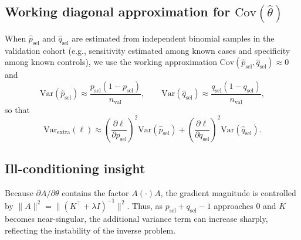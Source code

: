 \documentclass[pdflatex,sn-mathphys-num]{sn-jnl}%
\theoremstyle{thmstyleone}%
\theoremstyle{thmstyletwo}%
\theoremstyle{thmstylethree}%
\begin{document}
\subsection*{Working diagonal approximation for $\mathrm{Cov}(\hat\theta)$}

When $\hat p_{\mathrm{sel}}$ and $\hat q_{\mathrm{sel}}$ are estimated from independent binomial samples in the
validation cohort (e.g., sensitivity estimated among known cases and specificity among known controls),
we use the working approximation $\mathrm{Cov}(\hat p_{\mathrm{sel}},\hat q_{\mathrm{sel}})\approx 0$ and
\[
\mathrm{Var}(\hat p_{\mathrm{sel}})\approx \frac{p_{\mathrm{sel}}(1-p_{\mathrm{sel}})}{n_{\mathrm{val}}},
\qquad
\mathrm{Var}(\hat q_{\mathrm{sel}})\approx \frac{q_{\mathrm{sel}}(1-q_{\mathrm{sel}})}{n_{\mathrm{val}}},
\]
so that
\[
\mathrm{Var}_{\mathrm{extra}}(\ell)
\approx
\left(\frac{\partial \ell}{\partial p_{\mathrm{sel}}}\right)^2 \mathrm{Var}(\hat p_{\mathrm{sel}})
+
\left(\frac{\partial \ell}{\partial q_{\mathrm{sel}}}\right)^2 \mathrm{Var}(\hat q_{\mathrm{sel}}).
\]

\subsection*{Ill-conditioning insight}

Because $\partial A/\partial\theta$ contains the factor $A(\cdot)A$, the gradient magnitude is controlled by
$\|A\|^2=\|(K^\top+\lambda I)^{-1}\|^2$. Thus, as $p_{\mathrm{sel}}+q_{\mathrm{sel}}-1$ approaches $0$ and $K$ becomes
near-singular, the additional variance term can increase sharply, reflecting the instability of the inverse problem.
\end{document}
